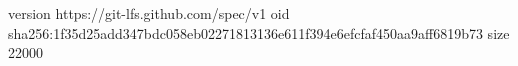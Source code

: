 version https://git-lfs.github.com/spec/v1
oid sha256:1f35d25add347bdc058eb02271813136e611f394e6efcfaf450aa9aff6819b73
size 22000
